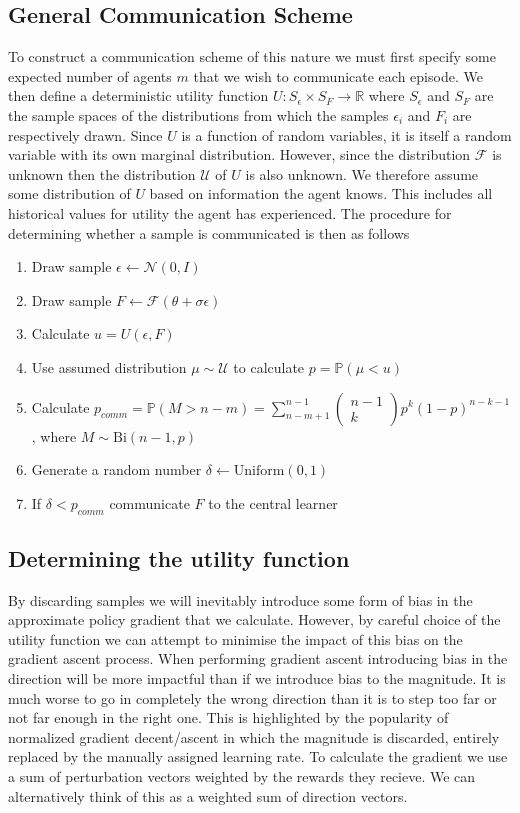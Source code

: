 \subsection{General Communication Scheme}
\label{sec:GeneralScheme}
To construct a communication scheme of this nature we must first specify some expected number of agents $m$ that we wish to communicate each episode.
We then define a deterministic utility function $U: S_\epsilon \times S_F \rightarrow \mathbb{R}$ where $S_\epsilon$ and $S_F$ are the sample spaces of the distributions from which the samples $\epsilon_i$ and $F_i$ are respectively drawn.
Since $U$ is a function of random variables, it is itself a random variable with its own marginal distribution. 
However, since the distribution $\mathcal{F}$ is unknown then the distribution $\mathcal{U}$ of $U$ is also unknown. 
We therefore assume some distribution of $U$ based on information the agent knows. 
This includes all historical values for utility the agent has experienced.
The procedure for determining whether a sample is communicated is then as follows
\begin{enumerate}
    \item Draw sample $\epsilon \leftarrow \mathcal{N}(0,I)$
    \item Draw sample $F \leftarrow \mathcal{F}(\theta + \sigma \epsilon)$
    \item Calculate $u = U(\epsilon,F)$
    \item Use assumed distribution $\mu \sim \mathcal{U}$ to calculate $p=\mathbb{P}(\mu < u)$
    \item Calculate $p_{comm}=\mathbb{P}(M>n-m) = \sum_{n-m+1}^{n-1} \begin{pmatrix}n-1 \\ k\end{pmatrix}p^k(1-p)^{n-k-1}$, where $M \sim \text{Bi}(n-1,p)$
    \item Generate a random number $\delta \leftarrow \text{Uniform}(0,1)$
    \item If $\delta<p_{comm}$ communicate $F$ to the central learner
\end{enumerate}

\subsection{Determining the utility function}
By discarding samples we will inevitably introduce some form of bias in the approximate policy gradient that we calculate. 
However, by careful choice of the utility function we can attempt to minimise the impact of this bias on the gradient ascent process.
When performing gradient ascent introducing bias in the direction will be more impactful than if we introduce bias to the magnitude. 
It is much worse to go in completely the wrong direction than it is to step too far or not far enough in the right one. 
This is highlighted by the popularity of normalized gradient decent/ascent \cite{NGD} in which the magnitude is discarded, entirely replaced by the manually assigned learning rate.
To calculate the gradient we use a sum of perturbation vectors weighted by the rewards they recieve. We can alternatively think of this as a weighted sum of direction vectors.

